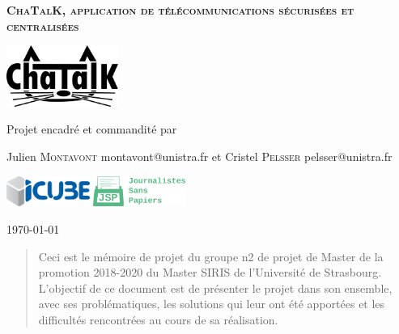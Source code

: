\documentclass{memoire}
\begin{document}
\begin{center}
  \vfill

  {
  \begin{spacing}{1.4}
  \huge
  \textsc {
  \textbf {
      ChaTalK, application de télécommunications sécurisées et centralisées
  }
  }
  \end{spacing}
  }
  \vfill
  \includegraphics[height=2.0cm]{logos/chatalk.png}
  \vfill

  {\large Projet encadré et commandité par}

  \medskip

  {\large Julien \textsc {Montavont}}
  {\small montavont@unistra.fr}
  et
  {\large Cristel \textsc {Pelsser}}
  {\small pelsser@unistra.fr}

  \medskip

  \includegraphics[height=1.0cm]{logos/icube.png}
  \vfill
  \includegraphics[height=1.0cm]{logos/jsp.png}

  {\small \today}
\end{center}

\cleardoublepage


\tableofcontents
{
  \listoffigures
  \listoftables
}

\cleardoublepage

\begin{abstract}
  Ceci est le mémoire de projet du groupe n2 de projet de Master de la promotion 2018-2020 du Master SIRIS de l'Université de Strasbourg.
\newline
L'objectif de ce document est de présenter le projet dans son ensemble, avec ses problématiques, les solutions qui leur ont été apportées et les difficultés rencontrées au cours de sa réalisation.
\end{abstract}
\end{document}
